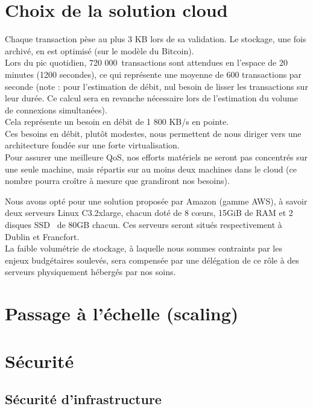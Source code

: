 \section{Choix de la solution cloud}
\label{sec:choix-solution-cloud}
Chaque transaction pèse au plus 3 KB lors de sa validation. Le stockage, 
une fois archivé, en est optimisé (sur le modèle du Bitcoin). \\
Lors du pic quotidien, 720 000 transactions sont attendues en l'espace de 20 
minutes (1200 secondes), ce qui représente une moyenne de 600 transactions 
par seconde (note : pour l'estimation de débit, nul besoin de lisser les 
transactions sur leur durée. Ce calcul sera en revanche nécessaire lors 
de l'estimation du volume de connexions simultanées). \\
Cela représente un besoin en débit de 1 800 KB/s en pointe. \\

Ces besoins en débit, plutôt modestes, nous permettent de nous diriger 
vers une architecture fondée sur une forte virtualisation. \\
Pour assurer une meilleure QoS, nos efforts matériels ne seront pas concentrés
sur une seule machine, mais répartis sur au moins deux machines dans le cloud
(ce nombre pourra croître à mesure que grandiront nos besoins).

Nous avons opté pour une solution proposée par Amazon (gamme AWS), à savoir deux
serveurs Linux C3.2xlarge, chacun doté de 8 cœurs, 15GiB de RAM et 2 disques SSD 
de 80GB chacun. Ces serveurs seront situés respectivement à Dublin et Francfort. \\

La faible volumétrie de stockage, à laquelle nous sommes contraints par les 
enjeux budgétaires soulevés, sera compensée par une délégation de ce rôle à 
des serveurs physiquement hébergés par nos soins.

\section{Passage à l'échelle (scaling)}
\label{sec:scaling}

\section{Sécurité}
\label{sec:securite}

\subsection{Sécurité d'infrastructure}
\label{subsec:securite-infrastructure}

